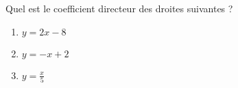 
\begin{exercice}\label{exosmath-0678}

    Quel est le coefficient directeur des droites suivantes ?
    \begin{enumerate}
        \item
            \( y=2x-8\)
        \item
            \( y=-x+2\)
        \item
            \( y=\frac{ x }{ 5 }\)
    \end{enumerate}
\end{exercice}
